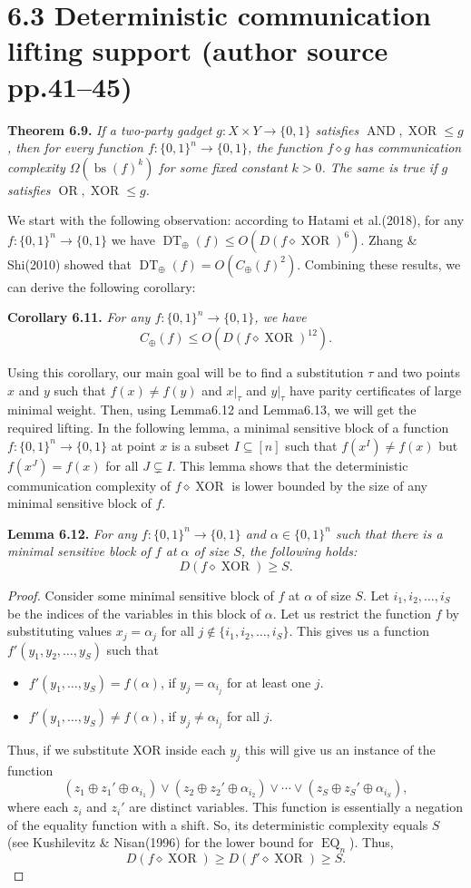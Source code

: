 \documentclass[10pt,a4paper]{article}
\newcommand{\bits}{\{0,1\}}
\newcommand{\DT}{\operatorname{DT}}
\newcommand{\comp}{\diamond}
\newcommand{\OR}{\operatorname{OR}}
\newcommand{\AND}{\operatorname{AND}}
\newcommand{\XOR}{\operatorname{XOR}}
\newenvironment{originalresult}[1]{\par\medskip\noindent\textbf{#1.}\itshape}{\par\medskip}
\begin{document}
\section*{6.3 Deterministic communication lifting support (author source pp.41--45)}
\begin{originalresult}{Theorem 6.9}
If a two-party gadget $g:X\times Y\to\bits$ satisfies $\AND,\XOR\le g$, then for every function $f:\bits^n\to\bits$, the function $f\comp g$ has communication complexity $\Omega(\operatorname{bs}(f)^k)$ for some fixed constant $k>0$. The same is true if $g$ satisfies $\OR,\XOR\le g$.
\end{originalresult}
We start with the following observation: according to Hatami et al.(2018), for any $f:\bits^n\to\bits$ we have $\DT_\oplus(f)\le O(D(f\comp\XOR)^6)$. Zhang \& Shi(2010) showed that $\DT_\oplus(f)=O(C_\oplus(f)^2)$. Combining these results, we can derive the following corollary:
\begin{originalresult}{Corollary 6.11}
For any $f:\bits^n\to\bits$, we have
\[C_\oplus(f)\le O(D(f\comp\XOR)^{12}).\]
\end{originalresult}
Using this corollary, our main goal will be to find a substitution $\tau$ and two points $x$ and $y$ such that $f(x)\ne f(y)$ and $x|_\tau$ and $y|_\tau$ have parity certificates of large minimal weight. Then, using Lemma6.12 and Lemma6.13, we will get the required lifting.
In the following lemma, a minimal sensitive block of a function $f:\bits^n\to\bits$ at point $x$ is a subset $I\subseteq[n]$ such that $f(x^I)\ne f(x)$ but $f(x^J)=f(x)$ for all $J\subsetneq I$. This lemma shows that the deterministic communication complexity of $f\comp\XOR$ is lower bounded by the size of any minimal sensitive block of $f$.
\begin{originalresult}{Lemma 6.12}
For any $f:\bits^n\to\bits$ and $\alpha\in\bits^n$ such that there is a minimal sensitive block of $f$ at $\alpha$ of size $S$, the following holds:
\[D(f\comp\XOR)\ge S.\]
\end{originalresult}
\begin{proof}
Consider some minimal sensitive block of $f$ at $\alpha$ of size $S$. Let $i_1,i_2,\ldots,i_S$ be the indices of the variables in this block of $\alpha$. Let us restrict the function $f$ by substituting values $x_j=\alpha_j$ for all $j\notin\{i_1,i_2,\ldots,i_S\}$. This gives us a function $f'(y_1,y_2,\ldots,y_S)$ such that
\begin{itemize}
\item $f'(y_1,\ldots,y_S)=f(\alpha)$, if $y_j=\alpha_{i_j}$ for at least one $j$.
\item $f'(y_1,\ldots,y_S)\ne f(\alpha)$, if $y_j\ne\alpha_{i_j}$ for all $j$.
\end{itemize}
Thus, if we substitute XOR inside each $y_j$ this will give us an instance of the function
\[(z_1\oplus z_1'\oplus\alpha_{i_1})\vee(z_2\oplus z_2'\oplus\alpha_{i_2})\vee\cdots\vee(z_S\oplus z_S'\oplus\alpha_{i_S}),\]
where each $z_i$ and $z_i'$ are distinct variables. This function is essentially a negation of the equality function with a shift. So, its deterministic complexity equals $S$ (see Kushilevitz \& Nisan(1996) for the lower bound for $\operatorname{EQ}_n$). Thus,
\[D(f\comp\XOR)\ge D(f'\comp\XOR)\ge S.\]
\end{proof}
\end{document}
